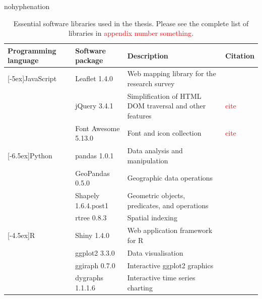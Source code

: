 \begin{hyphenrules}{nohyphenation}
    \begin{table}[H]
        \centering
        \caption[Essential software packages in thesis]{Essential software libraries used in the thesis. Please see the complete list of libraries in \textcolor{red}{appendix number something}.} 
        \label{tab:used_soft}
        \def\arraystretch{1.2}
        \setlength\tabcolsep{1.2ex}
        \begin{tabular}{ @{} >{\raggedright\arraybackslash}p{2.5cm} >{\raggedright\arraybackslash}p{3cm} >{\raggedright\arraybackslash}p{4cm} >{\raggedleft\arraybackslash}p{3cm} @{} }
            \toprule
            Programming language & Software package & Description & Citation \\
            \midrule
            \multirow{3}{*}[-5ex]{JavaScript} & Leaflet 1.4.0 & Web mapping library for the research survey & \cite{Agafonkin2019} \\
            & jQuery 3.4.1 & Simplification of HTML DOM traversal and other features & \textcolor{red}{cite} \\
            & Font Awesome 5.13.0 & Font and icon collection & \textcolor{red}{cite} \\
            \greyrule
            \multirow{4}{*}[-6.5ex]{Python} & pandas 1.0.1 & Data analysis and manipulation & \cite{McKinney2011a} \\
            & GeoPandas 0.5.0 & Geographic data operations & \cite{GeoPandasDevelopers2019} \\
            & Shapely 1.6.4.post1 & Geometric objects, predicates, and operations & \cite{Gillies2019} \\
            & rtree 0.8.3 & Spatial indexing & \cite{Gillies2014} \\
            \greyrule
            \multirow{4}{*}[-4.5ex]{R} & Shiny 1.4.0 & Web application framework for R & \cite{Chang2019} \\
            & ggplot2 3.3.0 & Data visualisation & \cite{Wickham2016} \\
            & ggiraph 0.7.0 & Interactive ggplot2 graphics & \cite{Gohel2019} \\
            & dygraphs 1.1.1.6 & Interactive time series charting & \cite{Vanderkam2018} \\
            \bottomrule
        \end{tabular}
    \end{table} 
\end{hyphenrules}

